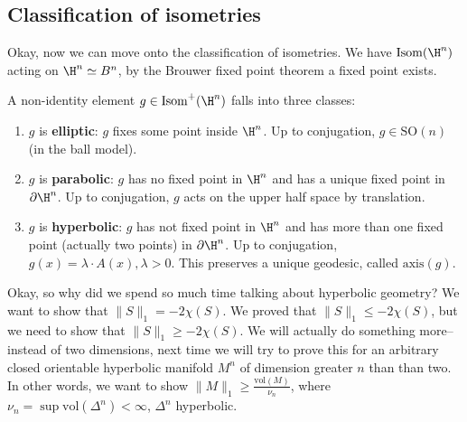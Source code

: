 \subsection{Classification of isometries}
Okay, now we can move onto the classification of isometries. We have $\mathrm{Isom}(\H^n )$ acting on $\H^n  \simeq  B^n $, by the Brouwer fixed point theorem a fixed point exists.
\begin{theorem}
    A non-identity element $g \in \mathrm{Isom}^+(\H^n )$ falls into three classes:
    \begin{enumerate}[label=(\arabic*)]
    \setlength\itemsep{-.2em}
\item $g$ is \textbf{elliptic}: $g$ fixes some point inside $\H^n $. Up to conjugation, $g \in \mathrm{SO}(n)$ (in the ball model).
\item $g$ is \textbf{parabolic}: $g$ has no fixed point in $\H^n $ and has a unique fixed point in $\partial \H^n $. Up to conjugation, $g$ acts on the upper half space by translation.
\item $g$ is \textbf{hyperbolic}: $g$ has not fixed point in $\H^n $ and has more than one fixed point (actually two points) in $\partial \H^n $. Up to conjugation, $g(x)=\lambda\cdot A(x),\lambda>0$. This preserves a unique geodesic, called $\mathrm{axis}(g)$.
    \end{enumerate}
\end{theorem}
Okay, so why did we spend so much time talking about hyperbolic geometry? We want to show that $\|S\|_1= -2\chi (S)$. We proved that $\|S\|_1\leq -2 \chi(S)$, but we need to show that $\|S\|_1 \geq -2\chi(S)$. We will actually do something more-- instead of two dimensions, next time we will try to prove this for an arbitrary closed orientable hyperbolic manifold $M^n $ of dimension greater $n $ than than two. In other words, we want to show $\| M\|_1 \geq \frac{\mathrm{vol}(M)}{\nu_n }$, where $\nu_n =\sup \mathrm{vol}(\Delta ^n ) < \infty$, $\Delta ^n $ hyperbolic.


